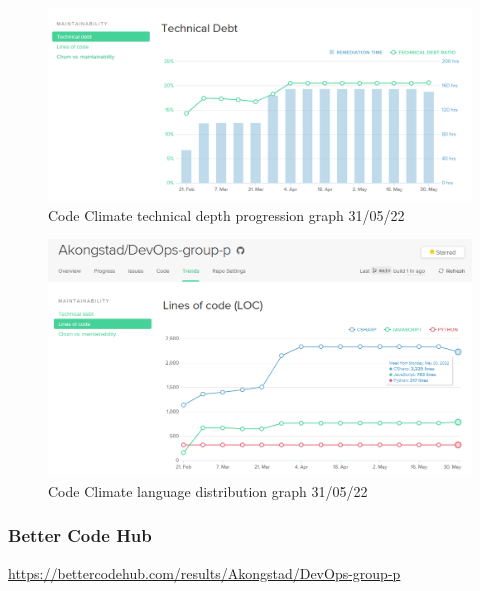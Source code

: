 \begin {figure}[H]
    \centering
    \includegraphics[scale=0.50]{images/analysis_tools/codeClimateTechDebt.PNG}
    \caption{Code Climate technical depth progression graph 31/05/22}
    \label{fig:codeClimateDepth}
\end{figure}

\begin {figure}[H]
    \centering
    \includegraphics[scale=0.50]{images/analysis_tools/CodeClimateTrendsCode.PNG}
    \caption{Code Climate language distribution graph 31/05/22}
    \label{fig:codeClimateLangDis}
\end{figure}

\subsubsection{Better Code Hub}
\label{app:codeAnalHub}
\href{https://bettercodehub.com/results/Akongstad/DevOps-group-p}{https://bettercodehub.com/results/Akongstad/DevOps-group-p}

